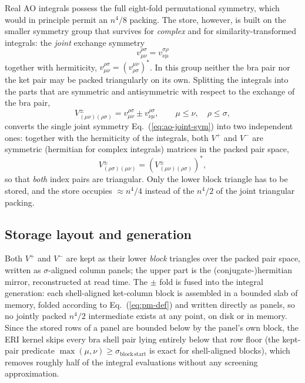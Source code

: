 \documentclass[a4paper,12pt,oneside]{book}
\newcommand{\eq}[1]{Eq.~(\ref{#1})}
\begin{document}
Real AO integrals possess the full eight-fold permutational symmetry, which would in principle
permit an $n^4/8$ packing. The store, however, is built on the smaller symmetry group that
survives for \emph{complex} and for similarity-transformed integrals: the \emph{joint} exchange
symmetry
\begin{equation}
\label{eq:ao-joint-sym}
v_{\mu\nu}^{\rho\sigma} = v_{\nu\mu}^{\sigma\rho}
\end{equation}
together with hermiticity, $v_{\mu\nu}^{\rho\sigma} = \left(v_{\rho\sigma}^{\mu\nu}\right)^*$.
In this group neither the bra pair nor the ket pair may be packed triangularly on its own. Splitting the
integrals into the parts that are symmetric and antisymmetric with respect to the exchange of the
bra pair,
\begin{equation}
\label{eq:pm-def}
V^{\pm}_{(\mu\nu)(\rho\sigma)} = v_{\mu\nu}^{\rho\sigma} \pm v_{\nu\mu}^{\rho\sigma},
\qquad \mu \le \nu,\quad \rho \le \sigma,
\end{equation}
converts the single joint symmetry \eq{eq:ao-joint-sym} into two independent ones: together with the
hermiticity of the integrals, both $V^{+}$ and $V^{-}$ are symmetric (hermitian for complex
integrals) matrices in the packed pair space,
\begin{equation}
V^{\pm}_{(\rho\sigma)(\mu\nu)} = \left(V^{\pm}_{(\mu\nu)(\rho\sigma)}\right)^*,
\end{equation}
so that \emph{both} index pairs are triangular. Only the lower block triangle has to be stored, and
the store occupies $\approx n^4/4$ instead of the $n^4/2$ of the joint triangular packing.

\subsection{Storage layout and generation}
Both $V^{+}$ and $V^{-}$ are kept as their lower \emph{block} triangles over the packed pair
space, written as $\sigma$-aligned column panels; the upper part is the (conjugate-)hermitian
mirror, reconstructed at read time. The $\pm$ fold is fused into the integral generation: each
shell-aligned ket-column block is assembled in a bounded slab of memory, folded according to
\eq{eq:pm-def} and written directly as panels, so no jointly packed $n^4/2$ intermediate exists at
any point, on disk or in memory. Since the stored rows of a panel are bounded below by the panel's
own block, the ERI kernel skips every bra shell pair lying entirely below that row floor
(the kept-pair predicate $\max(\mu,\nu)\ge\sigma_{\mathrm{block\,start}}$ is exact for
shell-aligned blocks), which removes roughly half of the integral evaluations without any
screening approximation.
\end{document}
